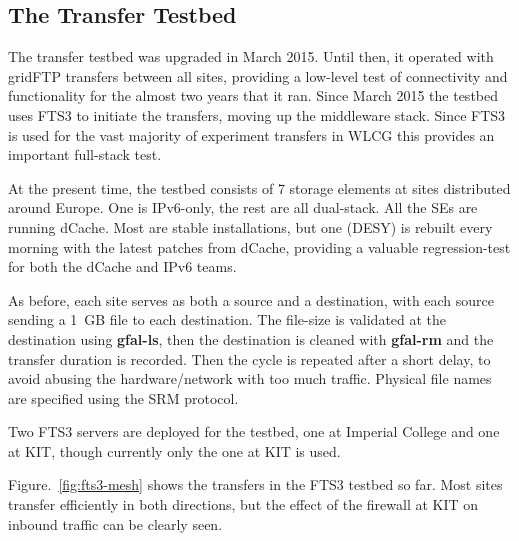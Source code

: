 \subsection{The Transfer Testbed}
The transfer testbed was upgraded in March 2015. Until then, it operated with gridFTP transfers between all sites, providing a low-level test of connectivity and functionality for the almost two years that it ran. Since March 2015 the testbed uses FTS3 \cite{Ayllon2014} to initiate the transfers, moving up the middleware stack. Since FTS3 is used for the vast majority of experiment transfers in WLCG this provides an important full-stack test.

At the present time, the testbed consists of 7 storage elements at sites distributed around Europe. One is IPv6-only, the rest are all dual-stack. All the SEs are running dCache. Most are stable installations, but one (DESY) is rebuilt every morning with the latest patches from dCache, providing a valuable regression-test for both the dCache and IPv6 teams.

As before, each site serves as both a source and a destination, with each source sending a 1~GB file to each destination. The file-size is validated at the destination using {\bf gfal-ls}, then the destination is cleaned with {\bf gfal-rm} and the transfer duration is recorded. Then the cycle is repeated after a short delay, to avoid abusing the hardware/network with too much traffic. Physical file names are specified using the SRM protocol.

Two FTS3 servers are deployed for the testbed, one at Imperial College and one at KIT, though currently only the one at KIT is used.

Figure.~\ref{fig:fts3-mesh} shows the transfers in the FTS3 testbed so far. Most sites transfer efficiently in both directions, but the effect of the firewall at KIT on inbound traffic can be clearly seen.

